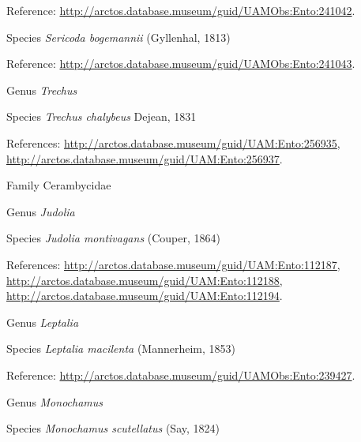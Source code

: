 \documentclass[9pt, article]{memoir}
\begin{document}
\begin{multicols}{2}
Reference: 
\url{http://arctos.database.museum/guid/UAMObs:Ento:241042}.

\vspace{6pt}\noindent\hspace{36pt}Species \textit{Sericoda bogemannii} (Gyllenhal, 1813)


Reference: 
\url{http://arctos.database.museum/guid/UAMObs:Ento:241043}.

\vspace{6pt}\noindent\hspace{30pt}Genus \textit{Trechus}


\vspace{6pt}\noindent\hspace{36pt}Species \textit{Trechus chalybeus} Dejean, 1831


References: 
\url{http://arctos.database.museum/guid/UAM:Ento:256935}, 
\url{http://arctos.database.museum/guid/UAM:Ento:256937}.

\vspace{6pt}\noindent\hspace{24pt}Family Cerambycidae


\vspace{6pt}\noindent\hspace{30pt}Genus \textit{Judolia}


\vspace{6pt}\noindent\hspace{36pt}Species \textit{Judolia montivagans} (Couper, 1864)


References: 
\url{http://arctos.database.museum/guid/UAM:Ento:112187}, 
\url{http://arctos.database.museum/guid/UAM:Ento:112188}, 
\url{http://arctos.database.museum/guid/UAM:Ento:112194}.

\vspace{6pt}\noindent\hspace{30pt}Genus \textit{Leptalia}


\vspace{6pt}\noindent\hspace{36pt}Species \textit{Leptalia macilenta} (Mannerheim, 1853)


Reference: 
\url{http://arctos.database.museum/guid/UAMObs:Ento:239427}.

\vspace{6pt}\noindent\hspace{30pt}Genus \textit{Monochamus}


\vspace{6pt}\noindent\hspace{36pt}Species \textit{Monochamus scutellatus} (Say, 1824)



\end{multicols}
\end{document}
